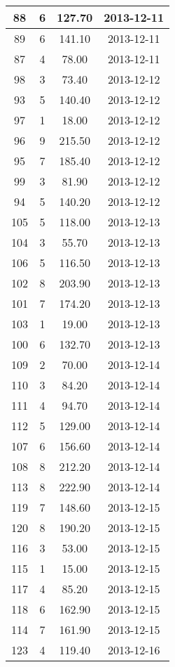 \documentclass[a4paper,11pt]{article}
\begin{document}
\begin{longtable}{|c|c|c|c|}
	 88 &   6 & 127.70 & 2013-12-11\\ \hline
	 89 &   6 & 141.10 & 2013-12-11\\ \hline
	 87 &   4 &  78.00 & 2013-12-11\\ \hline
	 98 &   3 &  73.40 & 2013-12-12\\ \hline
	 93 &   5 & 140.40 & 2013-12-12\\ \hline
	 97 &   1 &  18.00 & 2013-12-12\\ \hline
	 96 &   9 & 215.50 & 2013-12-12\\ \hline
	 95 &   7 & 185.40 & 2013-12-12\\ \hline
	 99 &   3 &  81.90 & 2013-12-12\\ \hline
	 94 &   5 & 140.20 & 2013-12-12\\ \hline
	 105 &   5 & 118.00 & 2013-12-13\\ \hline
	 104 &   3 &  55.70 & 2013-12-13\\ \hline
	 106 &   5 & 116.50 & 2013-12-13\\ \hline
	 102 &   8 & 203.90 & 2013-12-13\\ \hline
	 101 &   7 & 174.20 & 2013-12-13\\ \hline
	 103 &   1 &  19.00 & 2013-12-13\\ \hline
	 100 &   6 & 132.70 & 2013-12-13\\ \hline
	 109 &   2 &  70.00 & 2013-12-14\\ \hline
	 110 &   3 &  84.20 & 2013-12-14\\ \hline
	 111 &   4 &  94.70 & 2013-12-14\\ \hline
	 112 &   5 & 129.00 & 2013-12-14\\ \hline
	 107 &   6 & 156.60 & 2013-12-14\\ \hline
	 108 &   8 & 212.20 & 2013-12-14\\ \hline
	 113 &   8 & 222.90 & 2013-12-14\\ \hline
	 119 &   7 & 148.60 & 2013-12-15\\ \hline
	 120 &   8 & 190.20 & 2013-12-15\\ \hline
	 116 &   3 &  53.00 & 2013-12-15\\ \hline
	 115 &   1 &  15.00 & 2013-12-15\\ \hline
	 117 &   4 &  85.20 & 2013-12-15\\ \hline
	 118 &   6 & 162.90 & 2013-12-15\\ \hline
	 114 &   7 & 161.90 & 2013-12-15\\ \hline
	 123 &   4 & 119.40 & 2013-12-16\\ \hline

\end{longtable}
\end{document}
